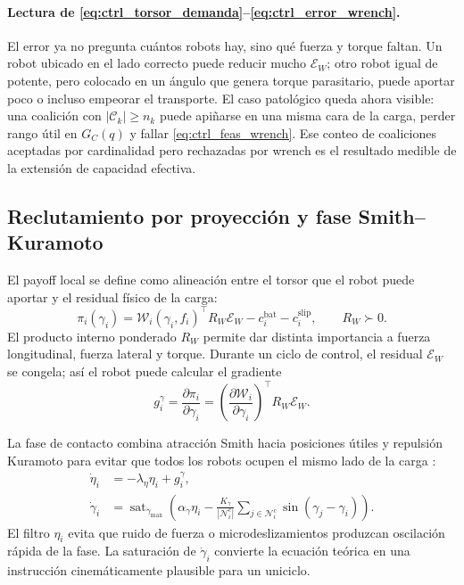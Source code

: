 \paragraph{Lectura de \eqref{eq:ctrl_torsor_demanda}--\eqref{eq:ctrl_error_wrench}.}
El error ya no pregunta cuántos robots hay, sino qué fuerza y torque faltan. Un robot
ubicado en el lado correcto puede reducir mucho $\mathcal E_W$; otro robot igual de
potente, pero colocado en un ángulo que genera torque parasitario, puede aportar poco o
incluso empeorar el transporte. El caso patológico queda ahora visible: una coalición con
$|\mathcal C_k|\ge n_k$ puede apiñarse en una misma cara de la carga, perder rango útil en
$G_C(q)$ y fallar \eqref{eq:ctrl_feas_wrench}. Ese conteo de coaliciones aceptadas por
cardinalidad pero rechazadas por wrench es el resultado medible de la extensión de
capacidad efectiva.

\subsection{Reclutamiento por proyección y fase Smith--Kuramoto}
\label{subsec:control-smith-kuramoto}

El payoff local se define como alineación entre el torsor que el robot puede aportar y el
residual físico de la carga:
\begin{equation}
  \pi_i(\gamma_i)
  =
  \mathcal W_i(\gamma_i,f_i)^\top
  R_W
  \mathcal E_W
  -
  c_i^{\mathrm{bat}}
  -
  c_i^{\mathrm{slip}},
  \qquad R_W\succ0 .
  \label{eq:ctrl_payoff_torsor}
\end{equation}
El producto interno ponderado $R_W$ permite dar distinta importancia a fuerza
longitudinal, fuerza lateral y torque. Durante un ciclo de control, el residual
$\mathcal E_W$ se congela; así el robot puede calcular el gradiente
\begin{equation}
  g_i^\gamma
  =
  \frac{\partial \pi_i}{\partial \gamma_i}
  =
  \left(\frac{\partial\mathcal W_i}{\partial\gamma_i}\right)^\top
  R_W\mathcal E_W .
  \label{eq:ctrl_gradiente_payoff}
\end{equation}

La fase de contacto combina atracción Smith hacia posiciones útiles y repulsión
Kuramoto para evitar que todos los robots ocupen el mismo lado de la carga
\citep{kuramoto1984chemical}:
\begin{equation}
\begin{aligned}
  \dot\eta_i &= -\lambda_\eta \eta_i + g_i^\gamma,\\
  \dot\gamma_i
  &=
  \operatorname{sat}_{\dot\gamma_{\max}}
  \left(
    \alpha_\gamma \eta_i
    -
    \frac{K_\gamma}{|\mathcal N_i^c|}
    \sum_{j\in\mathcal N_i^c}
    \sin(\gamma_j-\gamma_i)
  \right).
\end{aligned}
\label{eq:ctrl_smith_kuramoto_fase}
\end{equation}
El filtro $\eta_i$ evita que ruido de fuerza o microdeslizamientos produzcan oscilación
rápida de la fase. La saturación de $\dot\gamma_i$ convierte la ecuación teórica en una
instrucción cinemáticamente plausible para un uniciclo.

